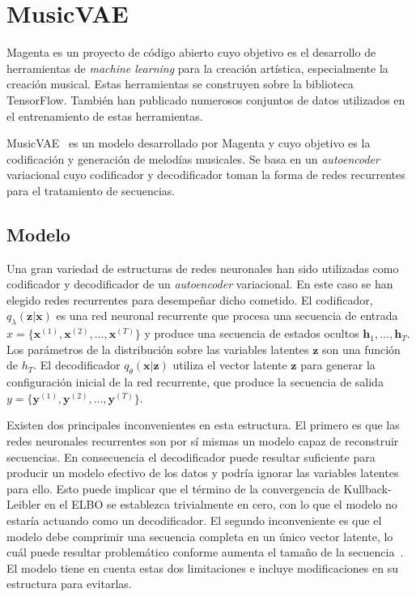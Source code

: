 
\chapter{MusicVAE}

Magenta es un proyecto de código abierto cuyo objetivo es el desarrollo de herramientas de \textit{machine learning} para la creación artística, especialmente la creación musical. Estas herramientas se construyen sobre la biblioteca TensorFlow. También han publicado numerosos conjuntos de datos utilizados en el entrenamiento de estas herramientas.

MusicVAE~\cite{roberts2018hierarchical} es un modelo desarrollado por Magenta y cuyo objetivo es la codificación y generación de melodías musicales. Se basa en un \textit{autoencoder} variacional cuyo codificador y decodificador toman la forma de redes recurrentes para el tratamiento de secuencias.

\section{Modelo}\label{modelo}

Una gran variedad de estructuras de redes neuronales han sido utilizadas como codificador y decodificador de un \textit{autoencoder} variacional. En este caso se han elegido redes recurrentes para desempeñar dicho cometido. El codificador, $q_{\lambda}(\textbf{z}\vert \textbf{x})$ es una red neuronal recurrente que procesa una secuencia de entrada $x = \{\textbf{x}^{(1)},\textbf{x}^{(2)},...,\textbf{x}^{(T)}\}$ y produce una secuencia de estados ocultos $\textbf{h}_1,...,\textbf{h}_T$. Los parámetros de la distribución sobre las variables latentes $\textbf{z}$ son una función de $h_T$. El decodificador $q_{\theta}(\textbf{x}\vert \textbf{z})$ utiliza el vector latente $\textbf{z}$ para generar la configuración inicial de la red recurrente, que produce la secuencia de salida $y = \{\textbf{y}^{(1)},\textbf{y}^{(2)},...,\textbf{y}^{(T)}\}$.

Existen dos principales inconvenientes en esta estructura. El primero es que las redes neuronales recurrentes son por sí mismas un modelo capaz de reconstruir secuencias. En consecuencia el decodificador puede resultar suficiente para producir un modelo efectivo de los datos y podría ignorar las variables latentes para ello. Esto puede implicar que el término de la convergencia de Kullback-Leibler en el ELBO se establezca trivialmente en cero, con lo que el modelo no estaría actuando como un decodificador. El segundo inconveniente es que el modelo debe comprimir una secuencia completa en un único vector latente, lo cuál puede resultar problemático conforme aumenta el tamaño de la secuencia~\cite{bahdanau2014neural}. El modelo tiene en cuenta estas dos limitaciones e incluye modificaciones en su estructura para evitarlas.

